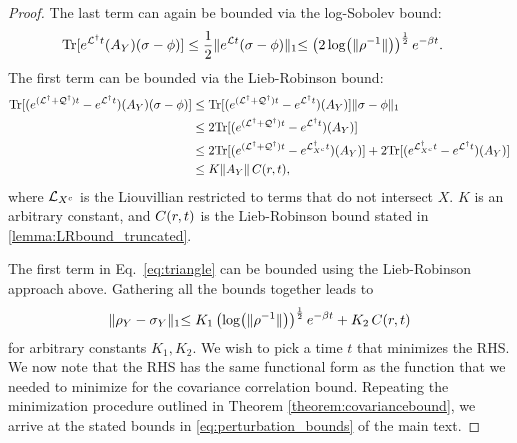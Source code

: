 \begin{proof}
The last term can again be bounded via the log-Sobolev bound:
\begin{align}
\text{Tr}[  e^{\mathcal{L}^\dagger t } (A_Y)   (  \sigma - \phi) ] &\leq \frac{1}{2} \lVert e^{\mathcal{L} t} (  \sigma - \phi) \lVert_1 \leq \left( 2 \log (\lVert \rho^{-1} \lVert )  \right)^{\frac12} e^{- \beta t}.
\end{align}
The first term can be bounded via the Lieb-Robinson bound:
\begin{align}
\text{Tr}[ (e^{(\mathcal{L}^\dagger +\mathcal{Q}^\dagger) t } -  e^{\mathcal{L}^\dagger t }) (A_Y)   (  \sigma - \phi) ]  &\leq   \text{Tr}[ (e^{(\mathcal{L}^\dagger +\mathcal{Q}^\dagger) t } -  e^{\mathcal{L}^\dagger t }) (A_Y)  ] \lVert \sigma - \phi \lVert_1 \\
&\leq 2 \text{Tr}[ (e^{(\mathcal{L}^\dagger +\mathcal{Q}^\dagger) t } -  e^{\mathcal{L}^\dagger t }) (A_Y)  ] \\
&\leq 2 \text{Tr}[ (e^{(\mathcal{L}^\dagger +\mathcal{Q}^\dagger) t } -  e^{\mathcal{L}_{X^c}^\dagger t }) (A_Y)  ] + 2 \text{Tr}[ (e^{\mathcal{L}_{X^c}^\dagger  t } -  e^{\mathcal{L}^\dagger t }) (A_Y)  ] \\
&\leq K \lVert A_Y \lVert \,\mathcal \mathcal{C}(r, t),
\end{align}
where $\mathcal{L}_{X^c}$ is the  Liouvillian restricted to terms that do not intersect $X$. $K$ is an arbitrary constant, and $\mathcal \mathcal{C}(r, t)$ is the Lieb-Robinson bound stated in \cref{lemma:LRbound_truncated}.

The first term in Eq.~\eqref{eq:triangle} can be bounded using  the Lieb-Robinson approach above. Gathering all the bounds together leads to
\begin{equation}
\lVert \rho_Y - \sigma_Y  \lVert_1  \leq K_1 \left(\log (\lVert \rho^{-1} \lVert )  \right)^{\frac12} e^{- \beta t} + K_2 \,\mathcal \mathcal{C}(r, t)
\end{equation}
for arbitrary constants $K_1,K_2$. We wish to pick a time $t$ that minimizes the RHS.
We now note that the RHS has the same functional form as the function that we needed to minimize for the covariance correlation bound. Repeating the minimization procedure outlined in Theorem \ref{theorem:covariancebound}, we arrive at the stated bounds in \cref{eq:perturbation_bounds} of the main text.
\end{proof}

